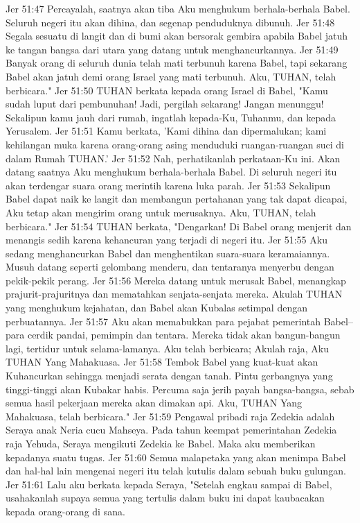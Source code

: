 Jer 51:47  Percayalah, saatnya akan tiba Aku menghukum berhala-berhala Babel. Seluruh negeri itu akan dihina, dan segenap penduduknya dibunuh.
Jer 51:48  Segala sesuatu di langit dan di bumi akan bersorak gembira apabila Babel jatuh ke tangan bangsa dari utara yang datang untuk menghancurkannya.
Jer 51:49  Banyak orang di seluruh dunia telah mati terbunuh karena Babel, tapi sekarang Babel akan jatuh demi orang Israel yang mati terbunuh. Aku, TUHAN, telah berbicara."
Jer 51:50  TUHAN berkata kepada orang Israel di Babel, "Kamu sudah luput dari pembunuhan! Jadi, pergilah sekarang! Jangan menunggu! Sekalipun kamu jauh dari rumah, ingatlah kepada-Ku, Tuhanmu, dan kepada Yerusalem.
Jer 51:51  Kamu berkata, 'Kami dihina dan dipermalukan; kami kehilangan muka karena orang-orang asing menduduki ruangan-ruangan suci di dalam Rumah TUHAN.'
Jer 51:52  Nah, perhatikanlah perkataan-Ku ini. Akan datang saatnya Aku menghukum berhala-berhala Babel. Di seluruh negeri itu akan terdengar suara orang merintih karena luka parah.
Jer 51:53  Sekalipun Babel dapat naik ke langit dan membangun pertahanan yang tak dapat dicapai, Aku tetap akan mengirim orang untuk merusaknya. Aku, TUHAN, telah berbicara."
Jer 51:54  TUHAN berkata, "Dengarkan! Di Babel orang menjerit dan menangis sedih karena kehancuran yang terjadi di negeri itu.
Jer 51:55  Aku sedang menghancurkan Babel dan menghentikan suara-suara keramaiannya. Musuh datang seperti gelombang menderu, dan tentaranya menyerbu dengan pekik-pekik perang.
Jer 51:56  Mereka datang untuk merusak Babel, menangkap prajurit-prajuritnya dan mematahkan senjata-senjata mereka. Akulah TUHAN yang menghukum kejahatan, dan Babel akan Kubalas setimpal dengan perbuatannya.
Jer 51:57  Aku akan memabukkan para pejabat pemerintah Babel--para cerdik pandai, pemimpin dan tentara. Mereka tidak akan bangun-bangun lagi, tertidur untuk selama-lamanya. Aku telah berbicara; Akulah raja, Aku TUHAN Yang Mahakuasa.
Jer 51:58  Tembok Babel yang kuat-kuat akan Kuhancurkan sehingga menjadi serata dengan tanah. Pintu gerbangnya yang tinggi-tinggi akan Kubakar habis. Percuma saja jerih payah bangsa-bangsa, sebab semua hasil pekerjaan mereka akan dimakan api. Aku, TUHAN Yang Mahakuasa, telah berbicara."
Jer 51:59  Pengawal pribadi raja Zedekia adalah Seraya anak Neria cucu Mahseya. Pada tahun keempat pemerintahan Zedekia raja Yehuda, Seraya mengikuti Zedekia ke Babel. Maka aku memberikan kepadanya suatu tugas.
Jer 51:60  Semua malapetaka yang akan menimpa Babel dan hal-hal lain mengenai negeri itu telah kutulis dalam sebuah buku gulungan.
Jer 51:61  Lalu aku berkata kepada Seraya, "Setelah engkau sampai di Babel, usahakanlah supaya semua yang tertulis dalam buku ini dapat kaubacakan kepada orang-orang di sana.
